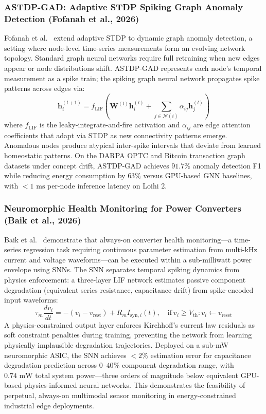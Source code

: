 \subsubsection{ASTDP-GAD: Adaptive STDP Spiking Graph Anomaly Detection (Fofanah et al., 2026)}
Fofanah et al.~\cite{Fofanah2026ASTDPGAD} extend adaptive STDP to dynamic graph anomaly detection, a setting where node-level time-series measurements form an evolving network topology. Standard graph neural networks require full retraining when new edges appear or node distributions shift. ASTDP-GAD represents each node's temporal measurement as a spike train; the spiking graph neural network propagates spike patterns across edges via:
\begin{equation}
    \mathbf{h}_i^{(l+1)} = f_{\text{LIF}}\!\left(\mathbf{W}^{(l)} \mathbf{h}_i^{(l)} + \sum_{j \in \mathcal{N}(i)} \alpha_{ij} \mathbf{h}_j^{(l)}\right)
\end{equation}
where $f_{\text{LIF}}$ is the leaky-integrate-and-fire activation and $\alpha_{ij}$ are edge attention coefficients that adapt via STDP as new connectivity patterns emerge. Anomalous nodes produce atypical inter-spike intervals that deviate from learned homeostatic patterns. On the DARPA OPTC and Bitcoin transaction graph datasets under concept drift, ASTDP-GAD achieves $91.7\%$ anomaly detection F1 while reducing energy consumption by $63\%$ versus GPU-based GNN baselines, with $<\!1\text{ ms}$ per-node inference latency on Loihi 2.

\subsubsection{Neuromorphic Health Monitoring for Power Converters (Baik et al., 2026)}
Baik et al.~\cite{Baik2026NeuromorphicPowerConverter} demonstrate that always-on converter health monitoring---a time-series regression task requiring continuous parameter estimation from multi-kHz current and voltage waveforms---can be executed within a sub-milliwatt power envelope using SNNs. The SNN separates temporal spiking dynamics from physics enforcement: a three-layer LIF network estimates passive component degradation (equivalent series resistance, capacitance drift) from spike-encoded input waveforms:
\begin{equation}
    \tau_m \frac{dv_i}{dt} = -(v_i - v_{\text{rest}}) + R_m I_{\text{syn},i}(t), \quad \text{if}\ v_i \geq V_{\text{th}}: v_i \leftarrow v_{\text{reset}}
\end{equation}
A physics-constrained output layer enforces Kirchhoff's current law residuals as soft constraint penalties during training, preventing the network from learning physically implausible degradation trajectories. Deployed on a sub-mW neuromorphic ASIC, the SNN achieves $<\!2\%$ estimation error for capacitance degradation prediction across $0$--$40\%$ component degradation range, with $0.74\text{ mW}$ total system power---three orders of magnitude below equivalent GPU-based physics-informed neural networks. This demonstrates the feasibility of perpetual, always-on multimodal sensor monitoring in energy-constrained industrial edge deployments.

